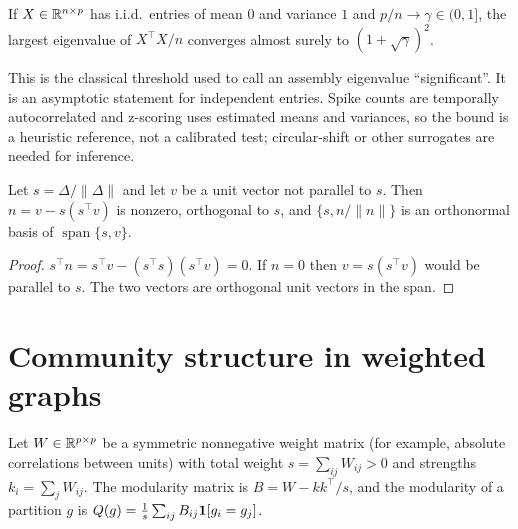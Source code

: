 \begin{theorem}\label{ars:pca-004}
If $X\in\mathbb R^{n\times p}$ has i.i.d.\ entries of mean $0$ and variance $1$ and $p/n\to\gamma\in(0,1]$, the largest eigenvalue of $X^\top X/n$ converges almost surely to $(1+\sqrt\gamma)^2$.
\end{theorem}
This is the classical threshold used to call an assembly eigenvalue ``significant''. It is an asymptotic statement for independent entries. Spike counts are temporally autocorrelated and z-scoring uses estimated means and variances, so the bound is a heuristic reference, not a calibrated test; circular-shift or other surrogates are needed for inference.

\begin{proposition}\label{ars:pca-005}
Let $s=\Delta/\|\Delta\|$ and let $v$ be a unit vector not parallel to $s$. Then $n=v-s(s^\top v)$ is nonzero, orthogonal to $s$, and $\{s,n/\|n\|\}$ is an orthonormal basis of $\operatorname{span}\{s,v\}$.
\end{proposition}
\begin{proof}
$s^\top n=s^\top v-(s^\top s)(s^\top v)=0$. If $n=0$ then $v=s(s^\top v)$ would be parallel to $s$. The two vectors are orthogonal unit vectors in the span.
\end{proof}

\section{Community structure in weighted graphs}
Let $W\in\mathbb R^{p\times p}$ be a symmetric nonnegative weight matrix (for example, absolute correlations between units) with total weight $s=\sum_{ij}W_{ij}>0$ and strengths $k_i=\sum_jW_{ij}$. The modularity matrix is $B=W-kk^\top/s$, and the modularity of a partition $g$ is $Q(g)=\frac1s\sum_{ij}B_{ij}\mathbf{1}[g_i=g_j]$.

